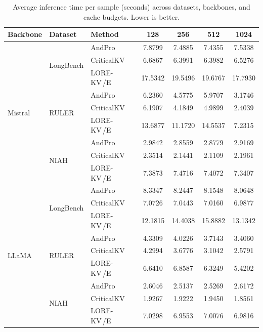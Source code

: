 \documentclass{article} %
\newcommand{\lorekvE}{LORE-KV\,/E}
\begin{document}
\begin{table}[t]
\centering
\caption{Average inference time per sample (seconds) across datasets, backbones, and cache budgets. Lower is better.}
\label{tab:runtime_comparison}
\small
\setlength{\tabcolsep}{5.0pt}
\renewcommand{\arraystretch}{1.08}
\begin{tabular}{lllcccc}
\toprule
\textbf{Backbone} & \textbf{Dataset} & \textbf{Method}
& \textbf{128} & \textbf{256} & \textbf{512} & \textbf{1024} \\
\midrule

\multirow{9}{*}{Mistral}
& \multirow{3}{*}{LongBench}
& AndPro      & 7.8799 & 7.4885 & 7.4355 & 7.5338 \\
&& CriticalKV & 6.6867 & 6.3991 & 6.3982 & 6.5276 \\
&& \lorekvE\ & 17.5342 & 19.5496 & 19.6767 & 17.7930 \\
\cmidrule(lr){2-7}

& \multirow{3}{*}{RULER}
& AndPro      & 6.2360 & 4.5775 & 5.9707 & 3.1746 \\
&& CriticalKV & 6.1907 & 4.1849 & 4.9899 & 2.4039 \\
&& \lorekvE\ & 13.6877 & 11.1720 & 14.5537 & 7.2315 \\
\cmidrule(lr){2-7}

& \multirow{3}{*}{NIAH}
& AndPro      & 2.9842 & 2.8559 & 2.8779 & 2.9169 \\
&& CriticalKV & 2.3514 & 2.1441 & 2.1109 & 2.1961 \\
&& \lorekvE\ & 7.3873 & 7.4716 & 7.4072 & 7.3407 \\
\midrule

\multirow{9}{*}{LLaMA}
& \multirow{3}{*}{LongBench}
& AndPro      & 8.3347 & 8.2447 & 8.1548 & 8.0648 \\
&& CriticalKV & 7.0726 & 7.0443 & 7.0160 & 6.9877 \\
&& \lorekvE\ & 12.1815 & 14.4038 & 15.8882 & 13.1342 \\
\cmidrule(lr){2-7}

& \multirow{3}{*}{RULER}
& AndPro      & 4.3309 & 4.0226 & 3.7143 & 3.4060 \\
&& CriticalKV & 4.2994 & 3.6776 & 3.1042 & 2.5791 \\
&& \lorekvE\ & 6.6410 & 6.8587 & 6.3249 & 5.4202 \\
\cmidrule(lr){2-7}

& \multirow{3}{*}{NIAH}
& AndPro      & 2.6046 & 2.5137 & 2.5269 & 2.6172 \\
&& CriticalKV & 1.9267 & 1.9222 & 1.9450 & 1.8561 \\
&& \lorekvE\ & 7.0298 & 6.9553 & 7.0076 & 6.9816 \\
\bottomrule
\end{tabular}
\end{table}
\end{document}
